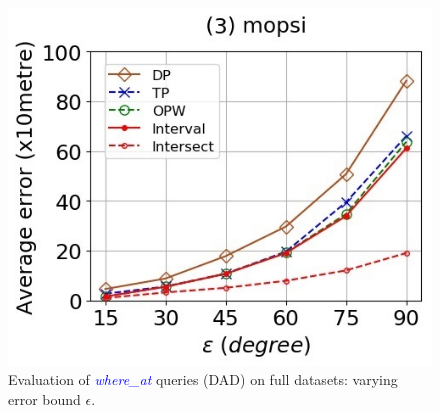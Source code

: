 \begin{figure}[tb!]
	\includegraphics[scale = 0.400]{Figures/Exp-where-DAD-error-epsilon-mopsi.jpg}
	\vspace{-1ex}
	\caption{\small Evaluation of \textcolor{blue}{\emph{where\_at}} queries (DAD) on full datasets: varying error bound $\epsilon$.}
	\label{fig:query-dad-epsilon}
	\vspace{-1.0ex}
\end{figure}



